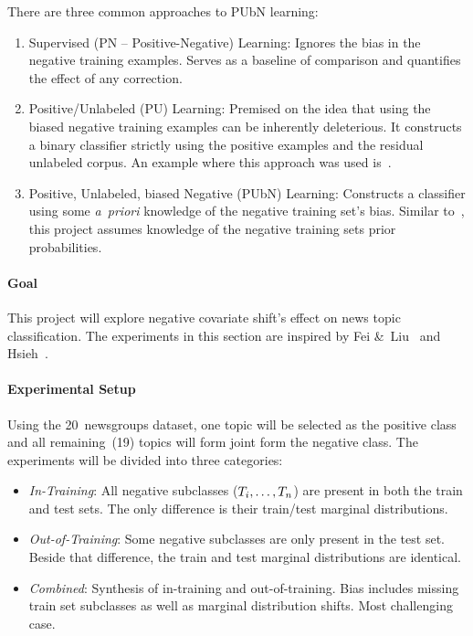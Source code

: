 \documentclass[10pt]{article}
\begin{document}
  There are three common approaches to PUbN learning:

  \begin{enumerate}
    \item Supervised (PN -- Positive-Negative) Learning: Ignores the bias in the negative training examples.  Serves as a baseline of comparison and quantifies the effect of any correction.

    \item Positive\-/Unlabeled (PU) Learning: Premised on the idea that using the biased negative training examples can be inherently deleterious.  It constructs a binary classifier strictly using the positive examples and the residual unlabeled corpus.  An example where this approach was used is~\cite{Li:2010}.

    \item Positive, Unlabeled, biased Negative (PUbN) Learning: Constructs a classifier using some \textit{a~priori} knowledge of the negative training set's bias.  Similar to~\cite{Hsieh:2019}, this project assumes knowledge of the negative training sets prior probabilities.
  \end{enumerate}

  \paragraph{Goal} This project will explore negative covariate shift's effect on news topic classification.  The experiments in this section are inspired by Fei \&~Liu~\cite{Fei:2015} and Hsieh\etal~\cite{Hsieh:2019}.

  \paragraph{Experimental Setup} Using the 20~newsgroups dataset, one topic will be selected as the positive class and all remaining~(19) topics will form joint form the negative class.  The experiments will be divided into three categories:

  \begin{itemize}
    \item \textit{In-Training}: All negative subclasses (${T_i,\ldots,T_n}$) are present in both the train and test sets.  The only difference is their train/test marginal distributions.

    \item \textit{Out-of-Training}: Some negative subclasses are only present in the test set. Beside that difference, the train and test marginal distributions are identical.

    \item \textit{Combined}: Synthesis of in-training and out-of-training.  Bias includes missing train set subclasses as well as marginal distribution shifts.  Most challenging case.
  \end{itemize}
\end{document}
